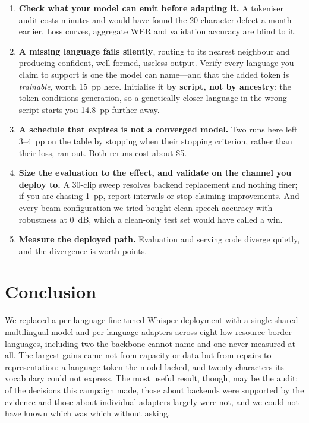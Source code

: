 \documentclass[sigconf,anonymous,review]{acmart}
\begin{document}
\begin{enumerate}
\item \textbf{Check what your model can emit before adapting it.} A tokeniser
audit costs minutes and would have found the 20-character defect a month
earlier. Loss curves, aggregate WER and validation accuracy are blind to it.

\item \textbf{A missing language fails silently}, routing to its nearest
neighbour and producing confident, well-formed, useless output. Verify every
language you claim to support is one the model can name---and that the added
token is \emph{trainable}, worth 15~pp here. Initialise it \textbf{by script,
not by ancestry}: the token conditions generation, so a genetically closer
language in the wrong script starts you 14.8~pp further away.

\item \textbf{A schedule that expires is not a converged model.} Two runs here
left 3--4~pp on the table by stopping when their stopping criterion, rather than
their loss, ran out. Both reruns cost about \$5.

\item \textbf{Size the evaluation to the effect, and validate on the channel you
deploy to.} A 30-clip sweep resolves backend replacement and nothing finer; if
you are chasing 1~pp, report intervals or stop claiming improvements. And every
beam configuration we tried bought clean-speech accuracy with robustness at
0~dB, which a clean-only test set would have called a win.

\item \textbf{Measure the deployed path.} Evaluation and serving code diverge
quietly, and the divergence is worth points.
\end{enumerate}

\section{Conclusion}

We replaced a per-language fine-tuned Whisper deployment with a single shared
multilingual model and per-language adapters across eight low-resource border
languages, including two the backbone cannot name and one never measured at all.
The largest gains came not from capacity or data but from repairs to
representation: a language token the model lacked, and twenty characters its
vocabulary could not express. The most useful result, though, may be the audit:
of the decisions this campaign made, those about backends were supported by the
evidence and those about individual adapters largely were not, and we could not
have known which was which without asking.
\end{document}
